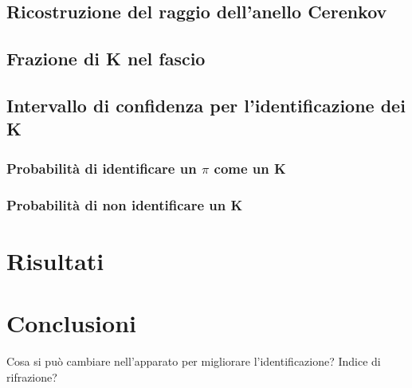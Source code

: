 \documentclass[8pt]{extarticle}
\begin{document}
\subsection{Ricostruzione del raggio dell'anello Cerenkov}

\subsection{Frazione di K nel fascio}
\subsection{Intervallo di confidenza per l'identificazione dei K}
\subsubsection{Probabilità di identificare un $\pi$ come un K}
\subsubsection{Probabilità di non identificare un K}

\section{Risultati}

\section{Conclusioni}
Cosa si può cambiare nell'apparato per migliorare l'identificazione? Indice di rifrazione?
%
\end{document}
